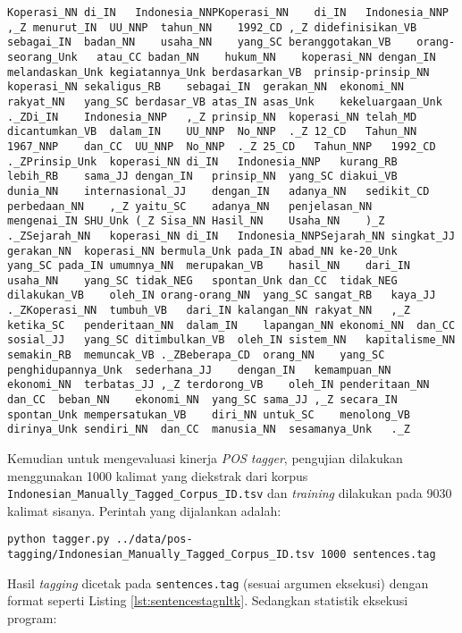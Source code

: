 \documentclass[paper=a4, fontsize=11pt]{scrartcl} %
\numberwithin{equation}{section} %
\numberwithin{figure}{section} %
\numberwithin{table}{section} %
\begin{document}
\begin{lstlisting}[caption={Wikipedia.nltk.tagged},label={lst:wikipedianltktagged}]
Koperasi_NN	di_IN	Indonesia_NNPKoperasi_NN	di_IN	Indonesia_NNP	,_Z	menurut_IN	UU_NNP	tahun_NN	1992_CD	,_Z	didefinisikan_VB	sebagai_IN	badan_NN	usaha_NN	yang_SC	beranggotakan_VB	orang-seorang_Unk	atau_CC	badan_NN	hukum_NN	koperasi_NN	dengan_IN	melandaskan_Unk	kegiatannya_Unk	berdasarkan_VB	prinsip-prinsip_NN	koperasi_NN	sekaligus_RB	sebagai_IN	gerakan_NN	ekonomi_NN	rakyat_NN	yang_SC	berdasar_VB	atas_IN	asas_Unk	kekeluargaan_Unk	._ZDi_IN	Indonesia_NNP	,_Z	prinsip_NN	koperasi_NN	telah_MD	dicantumkan_VB	dalam_IN	UU_NNP	No_NNP	._Z	12_CD	Tahun_NN	1967_NNP	dan_CC	UU_NNP	No_NNP	._Z	25_CD	Tahun_NNP	1992_CD	._ZPrinsip_Unk	koperasi_NN	di_IN	Indonesia_NNP	kurang_RB	lebih_RB	sama_JJ	dengan_IN	prinsip_NN	yang_SC	diakui_VB	dunia_NN	internasional_JJ	dengan_IN	adanya_NN	sedikit_CD	perbedaan_NN	,_Z	yaitu_SC	adanya_NN	penjelasan_NN	mengenai_IN	SHU_Unk	(_Z	Sisa_NN	Hasil_NN	Usaha_NN	)_Z	._ZSejarah_NN	koperasi_NN	di_IN	Indonesia_NNPSejarah_NN	singkat_JJ	gerakan_NN	koperasi_NN	bermula_Unk	pada_IN	abad_NN	ke-20_Unk	yang_SC	pada_IN	umumnya_NN	merupakan_VB	hasil_NN	dari_IN	usaha_NN	yang_SC	tidak_NEG	spontan_Unk	dan_CC	tidak_NEG	dilakukan_VB	oleh_IN	orang-orang_NN	yang_SC	sangat_RB	kaya_JJ	._ZKoperasi_NN	tumbuh_VB	dari_IN	kalangan_NN	rakyat_NN	,_Z	ketika_SC	penderitaan_NN	dalam_IN	lapangan_NN	ekonomi_NN	dan_CC	sosial_JJ	yang_SC	ditimbulkan_VB	oleh_IN	sistem_NN	kapitalisme_NN	semakin_RB	memuncak_VB	._ZBeberapa_CD	orang_NN	yang_SC	penghidupannya_Unk	sederhana_JJ	dengan_IN	kemampuan_NN	ekonomi_NN	terbatas_JJ	,_Z	terdorong_VB	oleh_IN	penderitaan_NN	dan_CC	beban_NN	ekonomi_NN	yang_SC	sama_JJ	,_Z	secara_IN	spontan_Unk	mempersatukan_VB	diri_NN	untuk_SC	menolong_VB	dirinya_Unk	sendiri_NN	dan_CC	manusia_NN	sesamanya_Unk	._Z
\end{lstlisting}

Kemudian untuk mengevaluasi kinerja \textit{POS tagger}, pengujian dilakukan menggunakan 1000 kalimat yang diekstrak dari korpus \verb|Indonesian_Manually_Tagged_Corpus_ID.tsv| dan \textit{training} dilakukan pada 9030 kalimat sisanya. Perintah yang dijalankan adalah:

\begin{lstlisting}
python tagger.py ../data/pos-tagging/Indonesian_Manually_Tagged_Corpus_ID.tsv 1000 sentences.tag
\end{lstlisting}

Hasil \textit{tagging} dicetak pada \verb|sentences.tag| (sesuai argumen eksekusi) dengan format seperti Listing \ref{lst:sentencestagnltk}. Sedangkan statistik eksekusi program:
\end{document}
